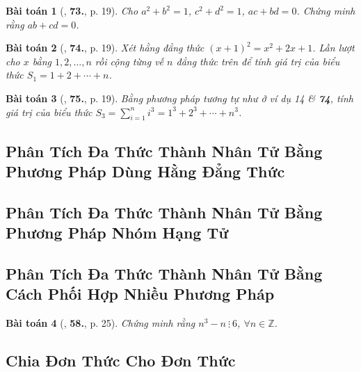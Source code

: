\documentclass{article}
\numberwithin{equation}{section}
\newtheorem{baitoan}{Bài toán}[section]
\begin{document}
\begin{baitoan}[\cite{Binh_Toan_8_tap_1}, \textbf{73.}, p. 19]
	Cho $a^2 + b^2 = 1$, $c^2 + d^2 = 1$, $ac + bd = 0$. Chứng minh rằng $ab + cd = 0$.
\end{baitoan}

\begin{baitoan}[\cite{Binh_Toan_8_tap_1}, \textbf{74.}, p. 19]
	Xét hằng đẳng thức $(x + 1)^2 = x^2 + 2x + 1$. Lần lượt cho $x$ bằng $1,2,\ldots,n$ rồi cộng từng vế $n$ đẳng thức trên để tính giá trị của biểu thức $S_1 = 1 + 2 + \cdots + n$.
\end{baitoan}

\begin{baitoan}[\cite{Binh_Toan_8_tap_1}, \textbf{75.}, p. 19]
	Bằng phương pháp tương tự như ở ví dụ 14 \& \textbf{74}, tính giá trị của biểu thức $S_3 = \sum_{i=1}^n i^3 = 1^3 + 2^3 + \cdots + n^3$.
\end{baitoan}


\subsection{Phân Tích Đa Thức Thành Nhân Tử Bằng Phương Pháp Dùng Hằng Đẳng Thức}


\subsection{Phân Tích Đa Thức Thành Nhân Tử Bằng Phương Pháp Nhóm Hạng Tử}


\subsection{Phân Tích Đa Thức Thành Nhân Tử Bằng Cách Phối Hợp Nhiều Phương Pháp}
\begin{baitoan}[\cite{SGK_Toan_8_tap_1}, \textbf{58.}, p. 25]
	Chứng minh rằng $n^3 - n\ \vdots\ 6$, $\forall n\in\mathbb{Z}$.
\end{baitoan}


\subsection{Chia Đơn Thức Cho Đơn Thức}
\end{document}
